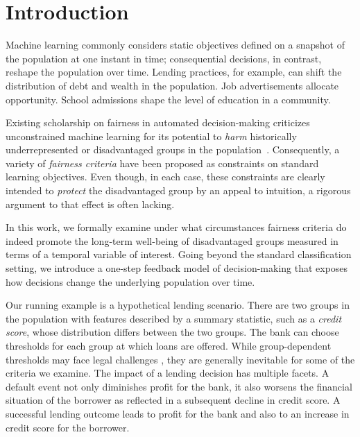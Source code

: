 

\section{Introduction}

Machine learning commonly considers static objectives defined on a snapshot of
the population at one instant in time; consequential decisions, in contrast,
reshape the population over time. Lending practices, for example, can shift the
distribution of debt and wealth in the population. Job advertisements 
allocate opportunity. School admissions shape the level of education in
a community.

Existing scholarship on fairness in automated decision-making criticizes
unconstrained machine learning for its potential to \emph{harm} historically
underrepresented or disadvantaged groups in the
population~\citep{whitehouse16,barocasselbst16}. Consequently, a variety of
\emph{fairness criteria} have been proposed as constraints on standard learning
objectives. Even though, in each case, these constraints are clearly intended to
\emph{protect} the disadvantaged group by an appeal to intuition, a rigorous
argument to that effect is often lacking.

In this work, we formally examine under what circumstances fairness criteria do
indeed promote the long-term well-being of disadvantaged groups measured in
terms of a temporal variable of interest. Going beyond the standard
classification setting, we introduce a one-step feedback model of decision-making
that exposes how decisions change the underlying population over time.

Our running example is a hypothetical lending scenario. There are two groups in
the population with features described by a summary statistic, such as a
\emph{credit score}, whose distribution differs between the two groups. The bank can
choose thresholds for each group at which loans are offered. While
group-dependent thresholds may face legal challenges \citep{ross2006}, they are
generally inevitable for some of the criteria we examine. The impact of a
lending decision has multiple facets. A default event not only diminishes profit for
the bank, it also worsens the financial situation of the borrower as reflected
in a subsequent decline in credit score. A successful lending outcome leads to
profit for the bank and also to an increase in credit score for the borrower.

